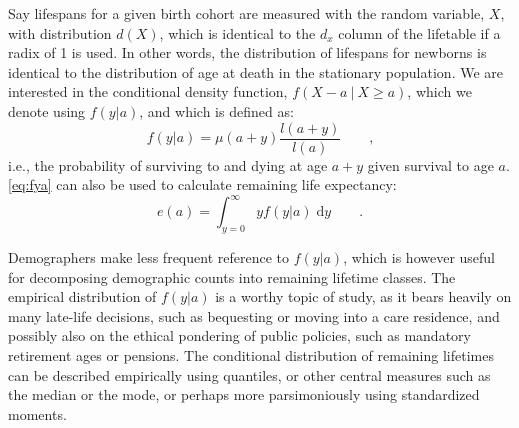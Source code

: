 \documentclass{article}
\newcommand{\dd}{\; \mathrm{d}}
\newcommand{\tc}{\quad\quad\text{,}}
\newcommand{\tp}{\quad\quad\text{.}}
\begin{document}
Say lifespans for a given birth cohort are measured with the random variable,
$X$, with distribution $d(X)$, which is identical to the $d_x$
column of the lifetable if a radix of 1 is used. In other words, the
distribution of lifespans for newborns is identical to the distribution of
age at death in the stationary population. We are interested in the
conditional density function, $f(X-a ~|~ X \ge a)$, which we denote using
$f(y|a)$, and which is defined as:
\begin{equation}
\label{eq:fya}
f(y|a) = \mu(a+y) \frac{l(a+y)}{l(a)} \tc
\end{equation}
i.e., the probability of surviving to and dying at age $a+y$ given survival to
age $a$. \eqref{eq:fya} can also be used to calculate remaining life expectancy:
\begin{equation}
e(a) = \int _{y=0}^\infty y f(y|a) \dd y \tp
\end{equation}

Demographers make less frequent
reference to $f(y|a)$, which is however useful for decomposing
demographic counts into remaining lifetime classes. The empirical distribution
of $f(y|a)$ is a worthy topic of study, as it bears heavily on many late-life
decisions, such as bequesting or moving into a care residence, and possibly also
on the ethical pondering of public policies, such as mandatory retirement ages
or pensions. The conditional distribution of remaining lifetimes can be
described empirically using quantiles, or other central measures such as the
median or the mode, or perhaps more parsimoniously using standardized moments.
\end{document}
